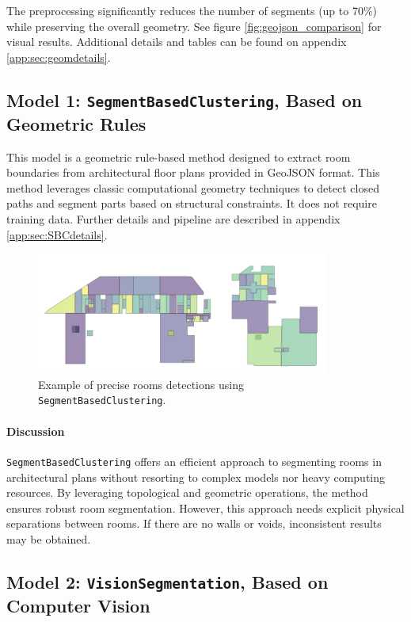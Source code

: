 \documentclass[11pt]{article}
\begin{document}
The preprocessing significantly reduces the number of segments (up to 70\%) while 
preserving the overall geometry. See figure \ref{fig:geojson_comparison} for visual 
results.
Additional details and tables can be found on appendix \ref{app:sec:geomdetails}.


\subsection{Model 1: \texttt{SegmentBasedClustering}, Based on Geometric Rules}

This model is a geometric rule-based method designed to extract room boundaries
from architectural floor plans provided in GeoJSON format.
This method 
leverages classic computational geometry techniques to detect closed paths
and segment parts based on structural constraints. It does not require training data.
Further details and pipeline  are described in appendix \ref{app:sec:SBCdetails}. 


\begin{figure}[h]
    \centering
    \includegraphics[width=0.6\linewidth, height=4cm, keepaspectratio]{figures/simplemodel.png}
    \caption{Example of precise rooms detections using \texttt{SegmentBasedClustering}.}
    \label{fig:closed_paths}
\end{figure}

\paragraph{Discussion} \texttt{SegmentBasedClustering} offers an efficient approach to segmenting 
rooms in architectural plans without resorting to complex models nor heavy 
computing resources. By leveraging 
topological and geometric operations, the method ensures robust room segmentation.
However, this approach needs explicit physical separations between rooms. 
If there are no walls or voids, inconsistent results may be obtained.


\subsection{Model 2: \texttt{VisionSegmentation}, Based on Computer Vision}
\end{document}

